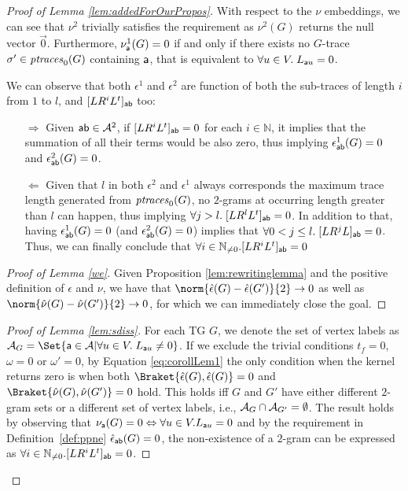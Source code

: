 \begin{proof}[Proof of Lemma \ref{lem:addedForOurPropos}]
	{With respect to the $\nu$ embeddings, we can see that $\nu^2$ trivially satisfies the requirement as $\nu^2(G)$ returns the null vector $\vec{0}$. Furthermore, $\nu^1_\const{a}(G)=0$ if and only if there exists no $G$-trace  $\nonlogtrace\in\ptraces{G}{0}$ containing $\const{a}$, that is equivalent to  $\forall u\in V.\;L_{\const{a}u}=0$.}
	
	{We can observe that both $\epsilon^1$ and $\epsilon^2$ are function of both the sub-traces of length $i$ from $1$ to $l$, and  $[LR^iL^t]_\const{ab}$ too:}
	\begin{itemize}
		\item[$\Rightarrow$] {Given $\const{ab}\in\tasks^2$, if $[LR^iL^t]_\const{ab}=0$ for each $i\in\mathbb{N}$, it implies that the summation of all their terms would be also zero, thus implying $\epsilon^1_\const{ab}(G)=0$ and $\epsilon^2_\const{ab}(G)=0$.}
		\item[$\Leftarrow$] {Given that $l$ in both $\epsilon^2$ and $\epsilon^1$ always corresponds the maximum trace length generated from $\ptraces{G}{0}$, no $2$-grams at occurring length greater than $l$ can happen, thus implying $\forall j>l.\; [LR^lL^t]_\const{ab}=0$. In addition to that, having $\epsilon^1_\const{ab}(G)=0$ (and $\epsilon^2_\const{ab}(G)=0$) implies that $\forall 0<j\leq l.\; [LR^jL]_\const{ab}=0$. Thus, we can finally conclude that $\forall i\in\mathbb{N}_{\neq 0}. [LR^iL^t]_\const{ab}=0$}
	\end{itemize}

\begin{proof}[Proof of Lemma \ref{we}]
	Given Proposition \ref{lem:rewritinglemma} and the positive definition of $\epsilon$ and $\nu$,  we have that $\norm{\hat{\epsilon}(G)-\hat{\epsilon}(G')}{2}\to 0$ as well as $\norm{\hat{\nu}(G)-\hat{\nu}(G')}{2}\to 0$, for which we can immediately close the goal.
\end{proof}


\begin{proof}[Proof of Lemma \ref{lem:sdiss}]
{For each TG $G$, we denote the set of vertex labels as 
$\tasks_G=\Set{\const{a}\in\tasks|\forall u\in V.\; L_{\const{a}u}\neq 0}$.} 
If we exclude the trivial conditions $t_f=0$, $\omega=0$ or $\omega'=0$, by Equation \ref{eq:corollLem1} the only condition 
when the kernel returns zero is when both $\Braket{\hat{\epsilon}(G),\hat{\epsilon}(G)}=0$ and 
$\Braket{\hat{\nu}(G),\hat{\nu}(G')}=0$ hold. {This holds  iff $G$ and $G'$ have either different $2$-gram sets or a different 
set of vertex labels, i.e., $\tasks_G\cap \tasks_{G'}=\emptyset$.} {The result holds by observing that 
$\nu_\const{a}(G)=0\Leftrightarrow \forall u\in V. L_{\const{a}u}=0$ and by the requirement in Definition~\ref{def:ppne} 
$\hat{\epsilon}_\const{ab}(G)=0$, the non-existence of a  $2$-gram can be expressed as $\forall i\in\mathbb{N}_{\neq0}. [LR^iL^t]_\const{ab}=0$.}
\end{proof}


\end{proof}
